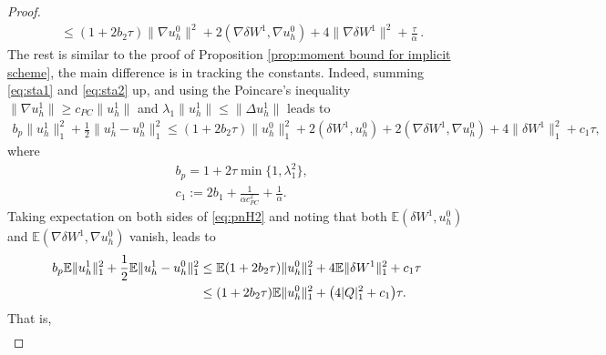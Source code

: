 \documentclass[reqno, 11pt]{amsart}
\theoremstyle{plain}
\theoremstyle{definition}
\theoremstyle{remark}
\numberwithin{equation}{section}
\numberwithin{theorem}{section}
\begin{document}
{\begin{proof}
\begin{align}
&\leq (1+2b_2\tau)\|\nabla u_h^0\|^2
+2(\nabla\delta W^1, \nabla u_h^0)+4\|\nabla\delta W^1\|^2+\frac{\tau}{\alpha} \,.
\end{align}
The rest is similar to the proof of Proposition \ref{prop:moment bound for implicit scheme}, the main difference is in tracking the constants. 
Indeed, summing \eqref{eq:sta1} and \eqref{eq:sta2} up, and using the Poincare's inequality $\|\nabla u_h^1\|\geq c_{PC}\| u_h^1\|$  and $\lambda_1\|u_h^1\|\leq \|\Delta u_h^1\|$ leads to
\begin{align}\label{eq:pnH2}
b_p\|u_h^1\|_1^2+\frac{1}{2}\|u_h^1-u_h^0\|_1^2\leq (1+2b_2\tau)\|u_h^0\|_1^2+2(\delta W^1, u_h^0)+2(\nabla \delta W^1, \nabla u_h^0)+4\|\delta W^1\|_1^2+c_1\tau,
\end{align}
where 
\begin{align*}
&b_p=1+2\tau\min\{1, \lambda_1^2\}, \\
 &c_1:=2b_1+\frac{1}{\alpha c_{PC}^2}+\frac{1}{\alpha}.
 \end{align*}
Taking expectation on both sides of \eqref{eq:pnH2} and noting that both $\mathbb{E}(\delta W^1, u_h^0)$ and $\mathbb{E}(\nabla \delta W^1, \nabla u_h^0)$ vanish,  
leads to
\begin{align}
b_p\mathbb{E}\|u_h^1\|_1^2+\frac{1}{2}\mathbb{E}\|u_h^1-u_h^0\|_1^2
&\leq \mathbb{E}(1+2b_2\tau)\|u_h^0\|_1^2+4\mathbb{E}\|\delta W^1\|_1^2+c_1\tau\notag\\
&\leq (1+2b_2\tau)\mathbb{E}\|u_h^0\|_1^2+\big(4|Q|_1^2+c_1\big)\tau.
\end{align}
That is,
\begin{align}

\end{align}
\end{proof}}
\end{document}
